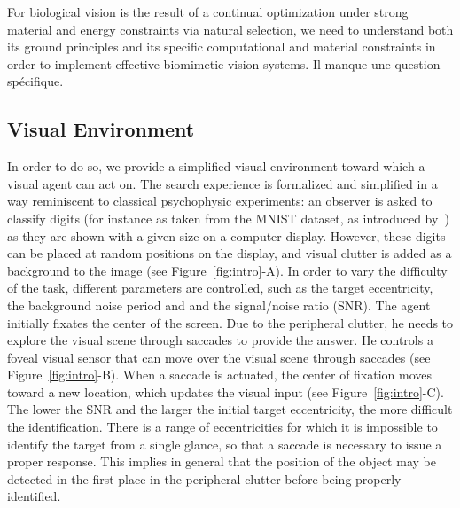 
For biological vision is the result of a continual optimization under strong material and energy constraints via natural selection, we need to understand both its ground principles and its specific computational and material constraints in order to implement effective biomimetic vision systems.
{\color{green} Il manque une question spécifique.}

\subsection{Visual Environment}

{\color{magenta} In order to do so}, we provide a simplified visual environment toward which a visual agent can act on.
The search experience is formalized and simplified in a way reminiscent to classical psychophysic experiments: an observer is asked to classify digits (for instance as taken from the MNIST dataset, as introduced by~\cite{Lecun1998}) as they are shown with a given size on a computer display.
However, these digits can be placed at random positions on the display, and visual clutter is added as a background to the image (see Figure~\ref{fig:intro}-A).
In order to vary the difficulty of the task, different parameters are controlled, such as the target eccentricity, the background noise period and and the signal/noise ratio (SNR).
The agent initially fixates the center of the screen. Due to the peripheral clutter, he needs to explore the visual scene through saccades to provide the answer. He controls a foveal visual sensor that can move over the visual scene through saccades (see Figure~\ref{fig:intro}-B). When a saccade is actuated, the center of fixation moves toward a new location, which updates the visual input (see Figure~\ref{fig:intro}-C).
The lower the SNR and the larger the initial target eccentricity, the more difficult the identification. There is a range of eccentricities for which it is impossible to identify the target from a single glance, so that a saccade is necessary to issue a proper response.
This implies in general that the position of the object may be detected in the first place in the peripheral clutter before being properly identified.

